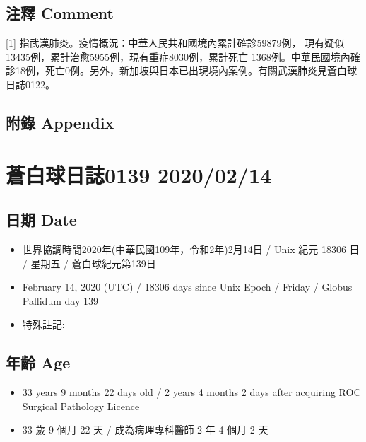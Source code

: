 \documentclass[
]{article}
\providecommand{\tightlist}{%
  \setlength{\itemsep}{0pt}\setlength{\parskip}{0pt}}
\begin{document}
\hypertarget{ux6ce8ux91cb-comment-12}{%
\subsection{注釋 Comment}\label{ux6ce8ux91cb-comment-12}}

{[}1{]} 指武漢肺炎。疫情概況：中華人民共和國境內累計確診59879例，
現有疑似 13435例，累計治愈5955例，現有重症8030例，累計死亡
1368例。中華民國境內確診18例，死亡0例。另外，新加坡與日本已出現境內案例。有關武漢肺炎見蒼白球日誌0122。

\hypertarget{ux9644ux9304-appendix-12}{%
\subsection{附錄 Appendix}\label{ux9644ux9304-appendix-12}}

\hypertarget{ux84bcux767dux7403ux65e5ux8a8c0139-20200214}{%
\section{蒼白球日誌0139
2020/02/14}\label{ux84bcux767dux7403ux65e5ux8a8c0139-20200214}}

\hypertarget{ux65e5ux671f-date-13}{%
\subsection{日期 Date}\label{ux65e5ux671f-date-13}}

\begin{itemize}
\tightlist
\item
  世界協調時間2020年(中華民國109年，令和2年)2月14日 / Unix 紀元 18306 日
  / 星期五 / 蒼白球紀元第139日
\item
  February 14, 2020 (UTC) / 18306 days since Unix Epoch / Friday /
  Globus Pallidum day 139
\item
  特殊註記:
\end{itemize}

\hypertarget{ux5e74ux9f61-age-13}{%
\subsection{年齡 Age}\label{ux5e74ux9f61-age-13}}

\begin{itemize}
\tightlist
\item
  33 years 9 months 22 days old / 2 years 4 months 2 days after
  acquiring ROC Surgical Pathology Licence
\item
  33 歲 9 個月 22 天 / 成為病理專科醫師 2 年 4 個月 2 天
\end{itemize}
\end{document}
